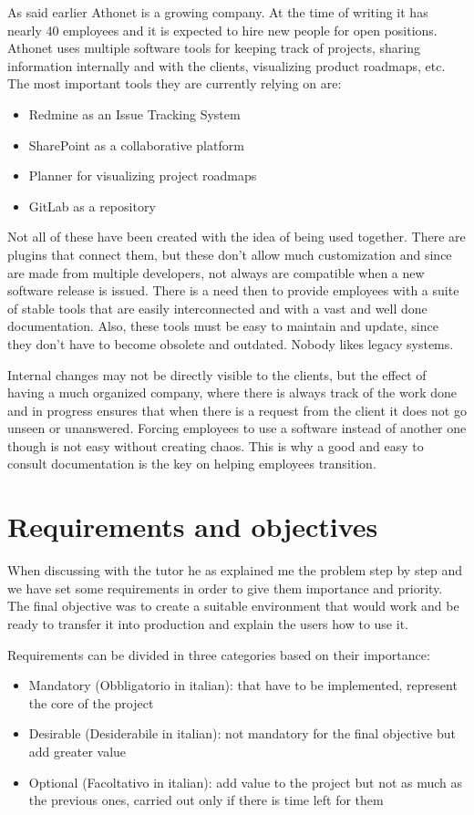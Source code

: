 	As said earlier Athonet is a growing company.
	At the time of writing it has nearly 40 employees and it is expected to hire new people for open positions.
	Athonet uses multiple software tools for keeping track of projects, sharing information internally and with the clients, visualizing product roadmaps, etc.
	The most important tools they are currently relying on are:
	\begin{itemize}
		\item Redmine as an Issue Tracking System
		\item SharePoint as a collaborative platform
		\item Planner for visualizing project roadmaps
		\item GitLab as a repository
	\end{itemize}
	Not all of these have been created with the idea of being used together.
	There are plugins that connect them, but these don't allow much customization and since are made from multiple developers, not always are compatible when a new software release is issued.
	There is a need then to provide employees with a suite of stable tools that are easily interconnected and with a vast and well done documentation.
	Also, these tools must be easy to maintain and update, since they don't have to become obsolete and outdated.
	Nobody likes legacy systems.
	
	
	Internal changes may not be directly visible to the clients, but the effect of having a much organized company, where there is always track of the work done and in progress ensures that when there is a request from the client it does not go unseen or unanswered.	
	Forcing employees to use a software instead of another one though is not easy without creating chaos.
	This is why a good and easy to consult documentation is the key on helping employees transition.

\section{Requirements and objectives}

	When discussing with the tutor he as explained me the problem step by step and we have set some requirements in order to give them importance and priority.
	The final objective was to create a suitable environment that would work and be ready to transfer it into production and explain the users how to use it.	

	Requirements can be divided in three categories based on their importance:
	\begin{itemize}
		\item Mandatory (Obbligatorio in italian): that have to be implemented, represent the core of the project
		\item Desirable (Desiderabile in italian): not mandatory for the final objective but add greater value
		\item Optional (Facoltativo in italian): add value to the project but not as much as the previous ones, carried out only if there is time left for them
	\end{itemize}

